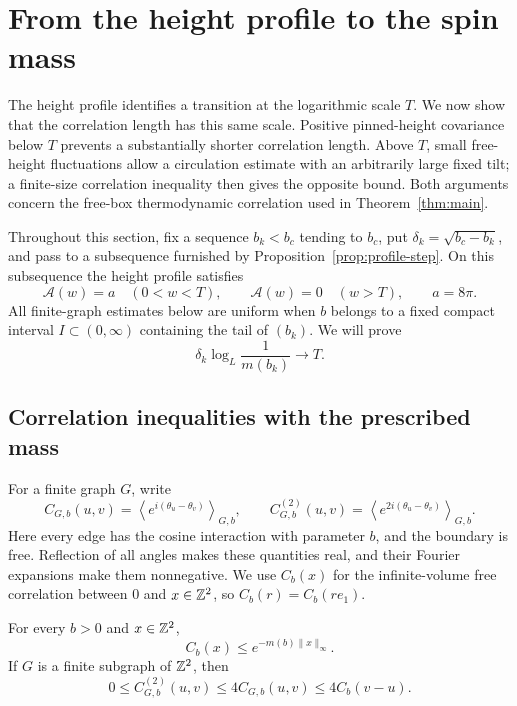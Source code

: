 \section{From the height profile to the spin mass}\label{sec:mass}

The height profile identifies a transition at the logarithmic scale
\(T\).  We now show that the correlation length has this same scale.
Positive pinned-height covariance below \(T\) prevents a substantially
shorter correlation length.  Above \(T\), small free-height fluctuations
allow a circulation estimate with an arbitrarily large fixed tilt;
a finite-size correlation inequality then gives the opposite bound.
Both arguments concern the free-box thermodynamic correlation used in
Theorem~\ref{thm:main}.

Throughout this section, fix a sequence \(b_k< b_c\) tending to \(b_c\),
put \(\delta_k=\sqrt{b_c-b_k}\), and pass to a subsequence furnished by
Proposition~\ref{prop:profile-step}.  On this subsequence the height
profile satisfies
\begin{equation}\label{eq:mass-profile}
 \mathcal A(w)=a\quad(0<w<T),\qquad
 \mathcal A(w)=0\quad(w>T),\qquad a=8\pi.
\end{equation}
All finite-graph estimates below are uniform when \(b\) belongs to a
fixed compact interval \(I\subset(0,\infty)\) containing the tail of
\((b_k)\).  We will prove
\begin{equation}\label{eq:mass-scale-goal}
             \delta_k\log_L\frac1{m(b_k)}\longrightarrow T.
\end{equation}

\subsection{Correlation inequalities with the prescribed mass}

For a finite graph \(G\), write
\[
 C_{G,b}(u,v)=\left\langle e^{i(\theta_u-\theta_v)}\right\rangle_{G,b},
 \qquad
 C^{(2)}_{G,b}(u,v)=
 \left\langle e^{2i(\theta_u-\theta_v)}\right\rangle_{G,b}.
\]
Here every edge has the cosine interaction with parameter \(b\), and
the boundary is free.  Reflection of all angles makes these quantities
real, and their Fourier expansions make them nonnegative.  We use
\(C_b(x)\) for the infinite-volume free correlation between \(0\) and
\(x\in\mathbb Z^2\), so \(C_b(r)=C_b(re_1)\).

\begin{lemma}\label{lem:mass-correlation-bounds}
For every \(b>0\) and \(x\in\mathbb Z^2\),
\begin{equation}\label{eq:mass-pointwise}
                       C_b(x)\le e^{-m(b)\|x\|_\infty}.
\end{equation}
If \(G\) is a finite subgraph of \(\mathbb Z^2\), then
\begin{equation}\label{eq:mass-charge-two}
 0\le C^{(2)}_{G,b}(u,v)\le4C_{G,b}(u,v)
                         \le4C_b(v-u).
\end{equation}
\end{lemma}


